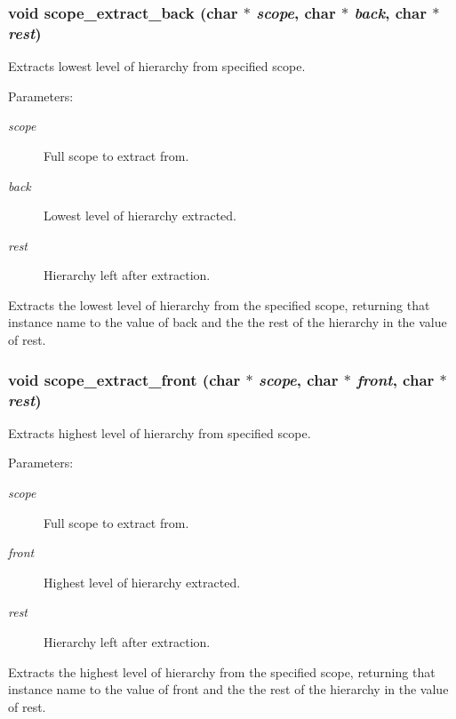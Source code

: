 \subsubsection{\setlength{\rightskip}{0pt plus 5cm}void scope\_\-extract\_\-back (char $\ast$ {\em scope}, char $\ast$ {\em back}, char $\ast$ {\em rest})}\label{util_8h_a10}


Extracts lowest level of hierarchy from specified scope.

\begin{Desc}
\item[Parameters:]
\begin{description}
\item[{\em scope}]Full scope to extract from. \item[{\em back}]Lowest level of hierarchy extracted. \item[{\em rest}]Hierarchy left after extraction.\end{description}
\end{Desc}
Extracts the lowest level of hierarchy from the specified scope, returning that instance name to the value of back and the the rest of the hierarchy in the value of rest. 
\subsubsection{\setlength{\rightskip}{0pt plus 5cm}void scope\_\-extract\_\-front (char $\ast$ {\em scope}, char $\ast$ {\em front}, char $\ast$ {\em rest})}\label{util_8h_a9}


Extracts highest level of hierarchy from specified scope.

\begin{Desc}
\item[Parameters:]
\begin{description}
\item[{\em scope}]Full scope to extract from. \item[{\em front}]Highest level of hierarchy extracted. \item[{\em rest}]Hierarchy left after extraction.\end{description}
\end{Desc}
Extracts the highest level of hierarchy from the specified scope, returning that instance name to the value of front and the the rest of the hierarchy in the value of rest. 
